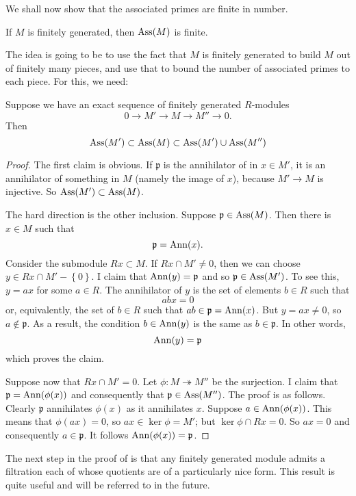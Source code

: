 We shall now show that the associated primes are finite in number.

\begin{proposition} \label{finiteassm}
If $M$ is finitely generated, then $\operatorname{Ass}(M)$ is finite.
\end{proposition}

The idea is going to be to use the fact that $M$ is finitely generated to build
$M$ out of finitely many pieces, and use that to bound the number of associated
primes to each piece. For this, we need:

\begin{lemma} \label{assexact} 
Suppose we have an exact sequence of finitely generated $R$-modules
\[ 0 \to M' \to M \to M'' \to 0.  \]
Then 
\[\operatorname{Ass}(M') \subset \operatorname{Ass}(M) \subset \operatorname{Ass}(M') \cup \operatorname{Ass}(M'')  \]
\end{lemma} 
\begin{proof} 
The first claim is obvious. If $\mathfrak{p}$ is the annihilator of
in $x \in M'$, it is an annihilator of something in $M$ (namely the image of
$x$), because
$M' \to M$ is injective. So $\operatorname{Ass}(M') \subset \operatorname{Ass}(M)$. 

The hard direction is the other inclusion. Suppose $\mathfrak{p} \in \operatorname{Ass}(M)$.
Then there is $x \in M$ such that
\[ \mathfrak{p} = \operatorname{Ann}(x).  \]
Consider the submodule $Rx \subset M$.  If $Rx \cap M' \neq 0$, then we can
choose $y \in Rx \cap M' - \left\{0\right\}$. I claim that $\operatorname{Ann}(y) =
\mathfrak{p}$ and so $\mathfrak{p} \in \operatorname{Ass}(M')$.
To see this, $ y = ax$ for some $a \in R$. The annihilator of $y$ is the set of elements
$b \in R$ such that
\[ abx = 0  \]
or, equivalently, the set of $b \in R$ such that $ab \in \mathfrak{p} =
\operatorname{Ann}(x)$. But $y = ax \neq 0$, so $a \notin \mathfrak{p}$. As a
result, the condition $b \in \operatorname{Ann}(y)$ is the same as $b \in \mathfrak{p}$. In
other words, 
\[ \operatorname{Ann}(y) = \mathfrak{p}  \]
which proves the claim.

Suppose now that  $Rx \cap M' = 0$. Let $\phi: M \twoheadrightarrow M''$
be the surjection. I claim that $\mathfrak{p} = \operatorname{Ann}(\phi(x))$ and
consequently that
$\mathfrak{p} \in \operatorname{Ass}(M'')$.  The proof is as follows. Clearly $\mathfrak{p}$
annihilates $\phi(x)$ as it annihilates $x$. Suppose $a \in \operatorname{Ann}(\phi(x))$.
This means that $\phi(ax) = 0$, so $ax \in \ker \phi=M'$; but $\ker \phi \cap Rx =
0$. So $ax = 0$ and consequently $a \in \mathfrak{p}$. It follows $\operatorname{Ann}(\phi(x)) = \mathfrak{p}$. 
\end{proof} 

The next step in the proof of  is that any
finitely generated module
admits a filtration each of whose quotients are of a particularly nice form.
This result is quite useful and will be referred to in the future.


